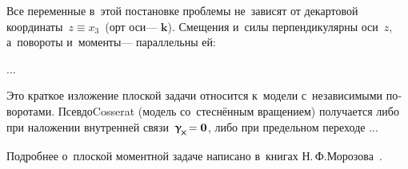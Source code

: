 

\label{para:planedeformation.cosseratcontinuum}

\begin{otherlanguage}{russian}

Все переменные в~этой постановке проблемы не~зависят от декартовой координаты~${z \equiv x_3}$~(орт оси\:--- $\bm{k}$).
Смещения и~силы перпендикулярны оси~$z$, а~повороты и~моменты\:--- параллельны ей:

...


Это краткое изложение плоской задачи относится к~модели с~независимыми поворотами.
Псевдо\rucontinuum Cosserat (модель со~стеснённым вращением) получается либо при наложении внутренней связи~${\distortiontensor_{\hspace{-0.25ex}\Xcompanion} \hspace{-0.32ex} = \bm{0}}$, либо при предельном переходе ...

Подробнее о~плоской моментной задаче написано в~книгах Н.\,Ф.\;Морозова~\cite{morozov-twodimensionalproblems, morozov-fractures}.

\end{otherlanguage}



\label{para:nonlinear.micropolar}

